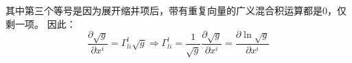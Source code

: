 \documentclass[UTF8,zihao=5]{ctexart}
\newcommand{\bm}[1]{{\mathbf{#1}}}
\newcommand*{\pd}[2]{\frac{\partial #1}{\partial #2}}
\begin{document}
其中第三个等号是因为展开缩并项后，带有重复向量的广义混合积运算都是0，仅剩一项。
因此：
$$
\pd{\sqrt{g}}{x^i}=\Gamma^l_{li}\sqrt{g}
\Rightarrow
\Gamma^l_{li}=\frac{1}{\sqrt{g}}\pd{\sqrt{g}}{x^i}
=\pd{\ln\sqrt{g}}{x^i}
$$












\end{document}

